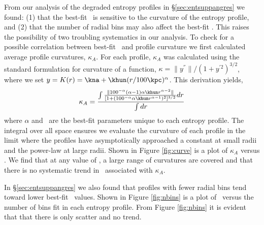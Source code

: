 From our analysis of the degraded entropy profiles in
\S\ref{sec:entsuppangres} we found: (1) that the best-fit \kna\ is
sensitive to the curvature of the entropy profile, and (2) that the
number of radial bins may also affect the best-fit \kna. This raises
the possibility of two troubling systematics in our analysis. To check
for a possible correlation between best-fit \kna\ and profile
curvature we first calculated average profile curvatures,
$\kappa_A$. For each profile, $\kappa_A$ was calculated using the
standard formulation for curvature of a function, $\kappa =
\|y^{''}\|/(1+y^{'2})^{3/2}$, where we set $y = K(r) =
\kna+\khun(r/100\kpc)^{\alpha}$. This derivation yields,
\begin{equation}
\kappa_A = \frac{\int\frac{\| 100^{-\alpha} (\alpha-1) \alpha \khun
    r^{\alpha-2}\|}{[1+(100^{-\alpha} \alpha \khun
      r^{\alpha-1})^2]^{3/2}} dr}{\int dr}
\end{equation}
where $\alpha$ and \khun\ are the best-fit parameters unique to each
entropy profile. The integral over all space ensures we evaluate the
curvature of each profile in the limit where the profiles have
asymptotically approached a constant at small radii and the power-law
at large radii. Shown in Figure \ref{fig:curve} is a plot of
$\kappa_A$ versus \kna. We find that at any value of \kna, a large
range of curvatures are covered and that there is no systematic trend
in \kna\ associated with $\kappa_A$.

In \S\ref{sec:entsuppangres} we also found that profiles with fewer
radial bins tend toward lower best-fit \kna\ values. Shown in Figure
\ref{fig:nbins} is a plot of \kna\ versus the number of bins fit in
each entropy profile. From Figure \ref{fig:nbins} it is evident that
that there is only scatter and no trend.

